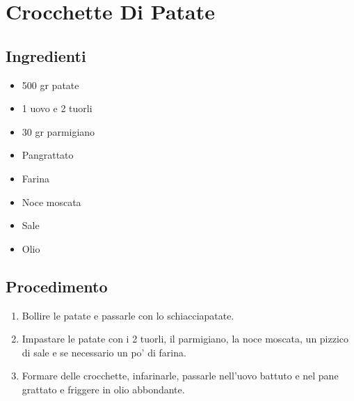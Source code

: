 \section{Crocchette Di Patate}
\subsection{Ingredienti}
\begin{itemize}
\item 500 gr patate  
\item 1 uovo e 2 tuorli  
\item 30 gr parmigiano  
\item Pangrattato  
\item Farina  
\item Noce moscata  
\item Sale  
\item Olio
\end{itemize}
\subsection{Procedimento}
\begin{enumerate}
\item  Bollire le patate e passarle con lo schiacciapatate.  
\item  Impastare le patate con i 2 tuorli, il parmigiano, la noce moscata, un pizzico di sale e se necessario un po' di farina.   
\item  Formare delle crocchette, infarinarle, passarle nell'uovo battuto e nel pane grattato e friggere in olio abbondante.
\end{enumerate}
